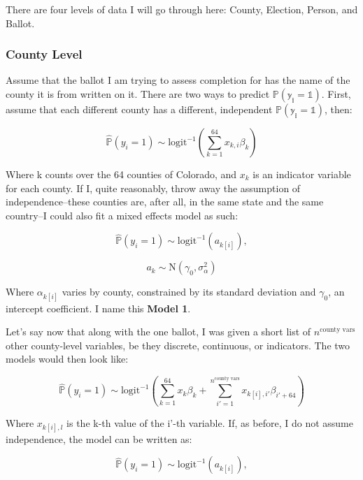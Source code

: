 \documentclass[12pt,twoside]{reedthesis}
\begin{document}
  There are four levels of data I will go through here: County, Election,
  Person, and Ballot.
  
  \subsubsection{County Level}\label{county-level}
  
  Assume that the ballot I am trying to assess completion for has the name
  of the county it is from written on it. There are two ways to predict
  \(\mathbb{P(y_i = 1)}\). First, assume that each different county has a
  different, independent \(\mathbb{P(y_i = 1)}\), then:
  
  \[\hat{\mathbb{P}}(y_i = 1) \sim \text{logit}^{-1}(\sum_{k = 1}^{64}x_{k,i}\beta_{k})\]
  
  Where k counts over the 64 counties of Colorado, and \(x_{k}\) is an
  indicator variable for each county. If I, quite reasonably, throw away
  the assumption of independence--these counties are, after all, in the
  same state and the same country--I could also fit a mixed effects model
  as such:
  
  \begin{equation} \tag{Model 1}
  \hat{\mathbb{P}}(y_i = 1) \sim \text{logit}^{-1}(a_{k[i]}),
  \end{equation}
  
  \[a_{k} \sim \text{N}(\gamma_0, \sigma_{\alpha}^2)\]
  
  Where \(\alpha_{k[i]}\) varies by county, constrained by its standard
  deviation and \(\gamma_0\), an intercept coefficient. I name this
  \textbf{Model 1}.
  
  Let's say now that along with the one ballot, I was given a short list
  of \(n^{\text{county vars}}\) other county-level variables, be they
  discrete, continuous, or indicators. The two models would then look
  like:
  
  \[\hat{\mathbb{P}}(y_i = 1) \sim \text{logit}^{-1}(\sum_{k = 1}^{64}x_{k}\beta_{k} + \sum_{i'=1}^{n^{\text{county vars}}}x_{k[i], i'}\beta_{i'+64})\]
  
  Where \(x_{k[i], l}\) is the k-th value of the i'-th variable. If, as
  before, I do not assume independence, the model can be written as:
  
  \begin{equation} \tag{Model 2}  
  \hat{\mathbb{P}}(y_i = 1) \sim \text{logit}^{-1}(a_{k[i]}),
  \end{equation}
  
\end{document}
